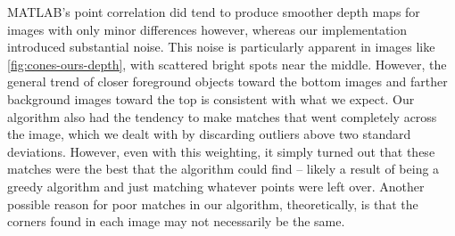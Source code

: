 MATLAB's point correlation did tend to produce smoother depth maps for images with only minor differences however, whereas our implementation introduced substantial noise. This noise is particularly apparent in images like \ref{fig:cones-ours-depth}, with scattered bright spots near the middle. However, the general trend of closer foreground objects toward the bottom images and farther background images toward the top is consistent with what we expect. Our algorithm also had the tendency to make matches that went completely across the image, which we dealt with by discarding outliers above two standard deviations. However, even with this weighting, it simply turned out that these matches were the best that the algorithm could find -- likely a result of being a greedy algorithm and just matching whatever points were left over.  Another possible reason for poor matches in our algorithm, theoretically, is that the corners found in each image may not necessarily be the same.
